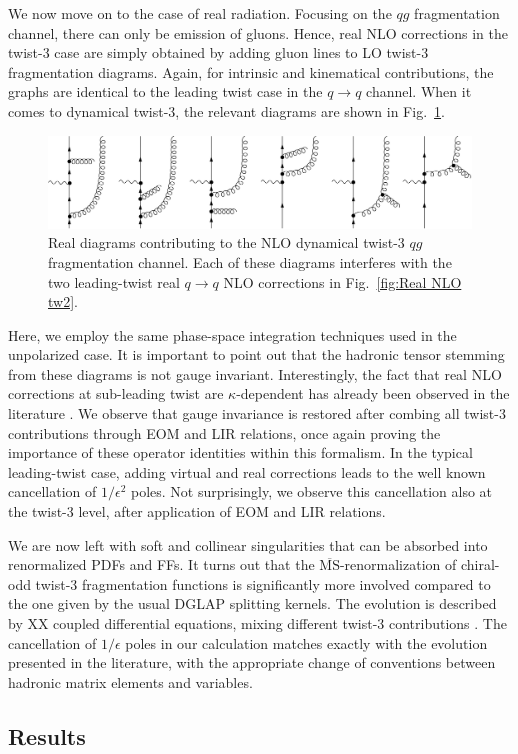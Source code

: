 We now move on to the case of real radiation. Focusing on the $qg$ fragmentation channel, there can only be emission of gluons. Hence, real NLO corrections in the twist-3 case are simply obtained by adding gluon lines to LO twist-3 fragmentation diagrams. Again, for intrinsic and kinematical contributions, the graphs are identical to the leading twist case in the $q\to q$ channel. When it comes to dynamical twist-3, the relevant diagrams are shown in Fig.~\ref{fig:Real NLO tw3}.
\begin{figure}
    \centering
    \includegraphics[width=0.99\linewidth]{fig/RealNLOTw3q2qg.png}
    \caption{Real diagrams contributing to the NLO dynamical twist-3 $qg$ fragmentation channel. Each of these diagrams interferes with the two leading-twist real $q \to q$ NLO corrections in Fig.~\ref{fig:Real NLO tw2}.}
    \label{fig:Real NLO tw3}
\end{figure}
Here, we employ the same phase-space integration techniques used in the unpolarized case. It is important to point out that the hadronic tensor stemming from these diagrams is not gauge invariant. Interestingly, the fact that real NLO corrections at sub-leading twist are $\kappa$-dependent has already been observed in the literature \cite{rein2025, Gamberg_2019}. We observe that gauge invariance is restored after combing all twist-3 contributions through EOM and LIR relations, once again proving the importance of these operator identities within this formalism. In the typical leading-twist case, adding virtual and real corrections leads to the well known cancellation of $1/\epsilon^2$ poles. Not surprisingly, we observe this cancellation also at the twist-3 level, after application of EOM and LIR relations.

We are now left with soft and collinear singularities that can be absorbed into renormalized PDFs and FFs. It turns out that the $\overline{\text{MS}}$-renormalization of chiral-odd twist-3 fragmentation functions is significantly more involved compared to the one given by the usual DGLAP splitting kernels. The evolution is described by XX coupled differential equations, mixing different twist-3 contributions \cite{Ma_2017}. The cancellation of $1/\epsilon$ poles in our calculation matches exactly with the evolution presented in the literature, with the appropriate change of conventions between hadronic matrix elements and variables.

\subsection{Results}






